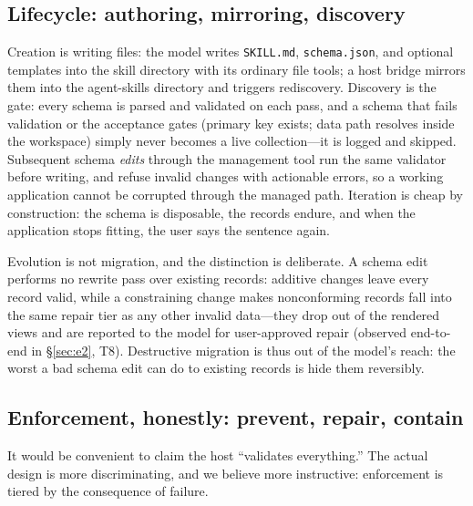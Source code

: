 \documentclass[11pt]{article}
\newcommand{\code}[1]{\texttt{\small #1}}
\begin{document}
\subsection{Lifecycle: authoring, mirroring, discovery}
\label{sec:lifecycle}

Creation is writing files: the model writes \code{SKILL.md}, \code{schema.json},
and optional templates into the skill directory with its ordinary file tools; a
host bridge mirrors them into the agent-skills directory and triggers
rediscovery. Discovery is the gate: every schema is parsed and validated on each
pass, and a schema that fails validation or the acceptance gates (primary key
exists; data path resolves inside the workspace) simply never becomes a live
collection---it is logged and skipped. Subsequent schema \emph{edits} through the
management tool run the same validator before writing, and refuse invalid changes
with actionable errors, so a working application cannot be corrupted through the
managed path. Iteration is cheap by construction: the schema is disposable, the
records endure, and when the application stops fitting, the user says the
sentence again.

Evolution is not migration, and the distinction is deliberate. A schema edit
performs no rewrite pass over existing records: additive changes leave every
record valid, while a constraining change makes nonconforming records fall into
the same repair tier as any other invalid data---they drop out of the rendered
views and are reported to the model for user-approved repair (observed
end-to-end in \S\ref{sec:e2}, T8). Destructive migration is thus out of the
model's reach: the worst a bad schema edit can do to existing records is hide
them reversibly.

\subsection{Enforcement, honestly: prevent, repair, contain}
\label{sec:enforcement}

It would be convenient to claim the host ``validates everything.'' The actual
design is more discriminating, and we believe more instructive: enforcement is
tiered by the consequence of failure.
\end{document}
